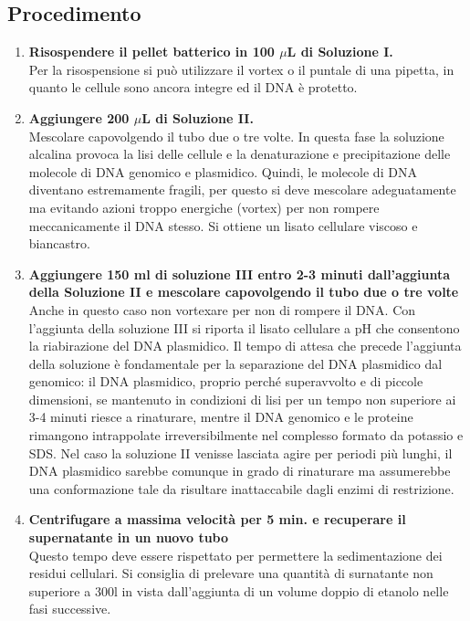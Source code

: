\documentclass{extarticle}
\begin{document}
\subsection*{Procedimento}
\begin{enumerate}
    \item \textbf{Risospendere il pellet batterico in 100 $\mu$L  di Soluzione I.}\\Per la risospensione si può utilizzare il vortex o il puntale di una pipetta, in quanto le cellule sono ancora integre ed il DNA è protetto.
    \item \textbf{Aggiungere 200  $\mu$L  di Soluzione II.}\\ Mescolare capovolgendo il tubo due o tre volte. In questa fase la soluzione alcalina provoca la lisi delle cellule e la denaturazione e precipitazione delle molecole di DNA genomico e plasmidico. Quindi, le molecole di DNA diventano estremamente fragili, per questo si deve mescolare adeguatamente ma evitando azioni troppo energiche (vortex) per non rompere meccanicamente il DNA stesso. Si ottiene un lisato cellulare viscoso e biancastro.
    \item \textbf{Aggiungere 150 ml di soluzione III entro 2-3 minuti dall'aggiunta della Soluzione II e mescolare capovolgendo il tubo due o tre volte}\\Anche in questo caso non vortexare per non di rompere il DNA. Con l'aggiunta della soluzione III si riporta il lisato cellulare a pH che consentono la riabirazione del DNA plasmidico. Il tempo di attesa che precede l'aggiunta della soluzione è fondamentale per la separazione del DNA plasmidico dal genomico: il DNA plasmidico, proprio perché superavvolto e di piccole dimensioni, se mantenuto in condizioni di lisi per un tempo non superiore ai 3-4 minuti riesce a rinaturare, mentre il DNA genomico e le proteine rimangono intrappolate irreversibilmente nel complesso formato da potassio e SDS. Nel caso la soluzione II venisse lasciata agire per periodi più lunghi, il DNA plasmidico sarebbe comunque in grado di rinaturare ma assumerebbe una conformazione tale da risultare inattaccabile dagli enzimi di restrizione.
    \item \textbf{Centrifugare a massima velocità per 5 min. e recuperare il supernatante in un nuovo tubo}\\Questo tempo deve essere rispettato per permettere la sedimentazione dei residui cellulari. Si consiglia di prelevare una quantità di surnatante non superiore a 300l in vista dall'aggiunta di un volume doppio di etanolo nelle fasi successive.

\end{enumerate}
\end{document}
